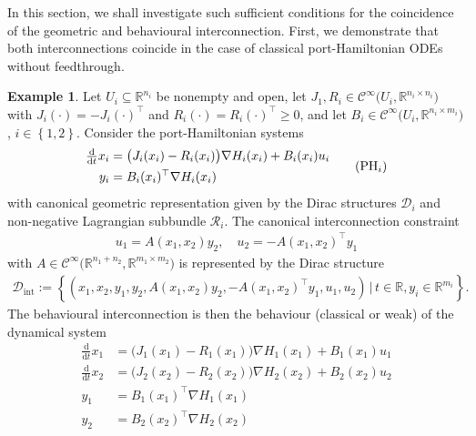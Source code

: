 \documentclass[preprint,12pt]{elsarticle}
\theoremstyle{definition}
\newtheorem{example}[theorem]{Example}
\newcommand{\set}[1]{\left\lbrace #1\right\rbrace}
\begin{document}
In this section, we shall investigate such sufficient conditions for the coincidence of the geometric and behavioural interconnection. First, we demonstrate that both interconnections coincide in the case of classical port-Hamiltonian ODEs without feedthrough.

\begin{example}\label{ex:classical_situation}
Let $U_i\subseteq\mathbb{R}^{n_i}$ be nonempty and open, let $J_1,R_i\in\mathcal{C}^\infty\big(U_i,\mathbb{R}^{n_i\times n_i}\big)$ with $J_i(\cdot) = -J_i(\cdot)^\top$ and $R_i(\cdot) = R_i(\cdot)^\top\geq 0$, and let $B_i\in\mathcal{C}^\infty\big(U_i,\mathbb{R}^{n_i\times m_i}\big)$, $i\in\set{1,2}$. Consider the port-Hamiltonian systems
\begin{equation}
\begin{aligned}
\tfrac{\mathrm{d}}{\mathrm{d}t}x_i & = \big(J_i(x_i)-R_i(x_i)\big)\nabla H_i(x_i)+B_i(x_i)u_i\\
y_i & = B_i(x_i)^\top\nabla H_i(x_i)
\end{aligned}\tag{$\mathrm{PH}_i$}
\end{equation}
with canonical geometric representation given by the Dirac structures $\mathcal{D}_i$ and non-negative Lagrangian subbundle $\mathcal{R}_i$. The canonical interconnection constraint
\begin{align}\label{eq:canonical_interconnection_constraint}
u_1 = A(x_1,x_2)y_2,\quad u_2 = -A(x_1,x_2)^\top y_1
\end{align}
with $A\in\mathcal{C}^{\infty}\big(\mathbb{R}^{n_1+n_2},\mathbb{R}^{m_1\times m_2}\big)$ is represented by the Dirac structure
\begin{align*}
\mathcal{D}_{\mathrm{int}} := \set{(x_1,x_2,y_1,y_2,A(x_1,x_2)y_2,-A(x_1,x_2)^\top y_1,u_1,u_2)\,\big\vert\,t\in\mathbb{R}, y_i\in\mathbb{R}^{m_i}}.
\end{align*}
The behavioural interconnection is then the behaviour (classical or weak) of the dynamical system
\begin{equation}\label{eq:example_interconnection_system}
\begin{aligned}
\tfrac{\mathrm{d}}{\mathrm{d}t}x_1 & = \big(J_1(x_1)-R_1(x_1)\big)\nabla H_1(x_1)+B_1(x_1)u_1\\
\tfrac{\mathrm{d}}{\mathrm{d}t}x_2 & = \big(J_2(x_2)-R_2(x_2)\big)\nabla H_2(x_2)+B_2(x_2)u_2\\
y_1 & = B_1(x_1)^\top\nabla H_1(x_1)\\
y_2 & = B_2(x_2)^\top\nabla H_2(x_2)\\

\end{aligned}
\end{equation}
\end{example}
\end{document}

